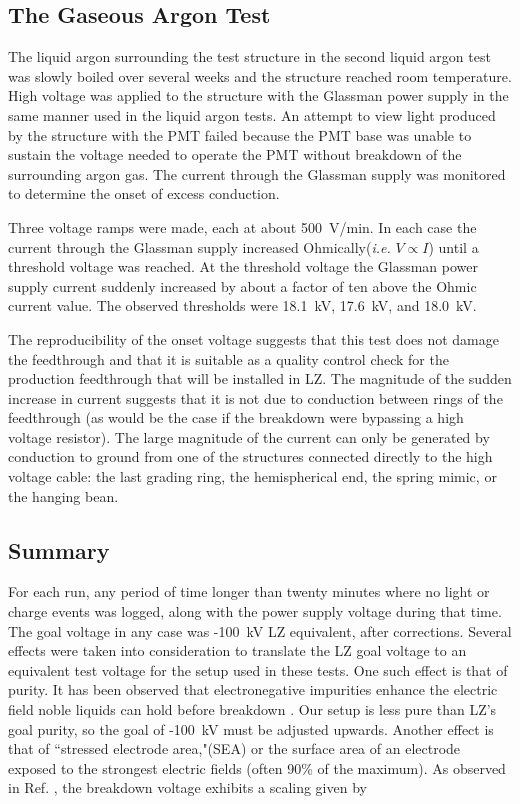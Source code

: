 \afterpage{\FloatBarrier}
\subsection{The Gaseous Argon Test}
\label{sec:gar_chv_test}

The liquid argon surrounding the test structure in the second liquid argon test was slowly boiled over several weeks and the structure reached room temperature. 
High voltage was applied to the structure with the Glassman power supply in the same manner used in the liquid argon tests.
An attempt to view light produced by the structure with the PMT failed because the PMT base was unable to sustain the voltage needed to operate the PMT without breakdown of the surrounding argon gas. 
The current through the Glassman supply was monitored to determine the onset of excess conduction.

Three voltage ramps were made, each at about 500~V/min.  In each case the current through the Glassman supply increased Ohmically(\textit{i.e.} $V \propto I$) until a threshold voltage was reached.
At the threshold voltage the Glassman power supply current suddenly increased by about a factor of ten above the Ohmic current value. 
The observed thresholds were 18.1~kV, 17.6~kV, and 18.0~kV.

The reproducibility of the onset voltage suggests that this test does not damage the feedthrough and that it is suitable as a quality control check for the production feedthrough that will be installed in LZ.
The magnitude of the sudden increase in current suggests that it is not due to conduction between rings of the feedthrough (as would be the case if the breakdown were bypassing a high voltage resistor).  The large magnitude of the current can only be generated by conduction to ground from one of the structures connected directly to the high voltage cable: the last grading ring, the hemispherical end, the spring mimic, or the hanging bean. 

\subsection{Summary}

For each run, any period of time longer than twenty minutes where no light or charge events was logged, along with the power supply voltage during that time.
The goal voltage in any case was -100~kV LZ equivalent, after corrections.
Several effects were taken into consideration to translate the LZ goal voltage to an equivalent test voltage for the setup used in these tests.
One such effect is that of purity.
It has been observed that electronegative impurities enhance the electric field noble liquids can hold before breakdown \cite{acciarri_liquid_2014}.
Our setup is less pure than LZ's goal purity, so the goal of -100~kV must be adjusted upwards.
Another effect is that of ``stressed electrode  area,"(SEA) or the surface area of an electrode exposed to the strongest electric fields (often 90\% of the maximum).
As observed in Ref. \cite{tvrznikova_direct_2019}, the breakdown voltage exhibits a scaling given by 

